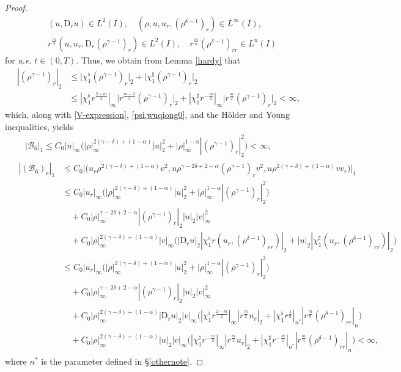 \documentclass[11pt,reqno]{amsart}
\numberwithin{rk}{section}
\numberwithin{prop}{section}
\numberwithin{mydef}{section}
\numberwithin{lem}{section}
\numberwithin{equation}{section}
\numberwithin{thm}{section}
\begin{document}
\begin{proof}
\begin{align*}
&(u,\mathrm{D}_r u)\in L^2(I),\quad  (\rho,u,u_r,(\rho^{\delta-1})_r)\in L^\infty(I),\\
&r^\frac{m}{2} (u,u_r,\mathrm{D}_r(\rho^{\gamma-1})_r)\in L^2(I),\quad r^\frac{m}{n} (\rho^{\delta-1})_{rr} \in L^n(I)
\end{align*}
for {\it a.e.} $t\in (0,T)$. Thus, we obtain from Lemma \ref{hardy} that
\begin{equation*}
\begin{aligned}
|(\rho^{\gamma-1})_r|_2&\leq  \big|\chi_1^\flat(\rho^{\gamma-1})_r\big|_2+\big|\chi_1^\sharp(\rho^{\gamma-1})_r\big|_2\\
&\leq |\chi_1^\flat r^\frac{2-m}{2}|_\infty\big|r^\frac{m-2}{2}(\rho^{\gamma-1})_r\big|_2 + |\chi_1^\sharp r^{-\frac{m}{2}}|_\infty \big|r^\frac{m}{2}(\rho^{\gamma-1})_r\big|_2<\infty,
\end{aligned}
\end{equation*}
which, along with \eqref{V-expression}, \eqref{psi,wuqiong0}, and the H\"older and Young inequalities, yields
\begin{align*}
&\quad\, |\mathcal{B}_6|_1 \leq C_0|u|_\infty\big(|\rho|_\infty^{2(\gamma-\delta)+(1-\alpha)}|u|_2^2+|\rho|_\infty^{1-\alpha}|(\rho^{\gamma-1})_r|_2^2\big)<\infty,\\[1mm]
&\begin{aligned}
|(\mathcal{B}_6)_r|_1&\leq C_0\big|\big(u_r\rho^{2(\gamma-\delta)+(1-\alpha)} v^2, u\rho^{\gamma-2\delta+2-\alpha}(\rho^{\gamma-1})_r v^2,u\rho^{2(\gamma-\delta)+(1-\alpha)} vv_r\big)\big|_1\\
&\leq C_0|u_r|_\infty\big(|\rho|_\infty^{2(\gamma-\delta)+(1-\alpha)}|u|_2^2+|\rho|_\infty^{1-\alpha}|(\rho^{\gamma-1})_r|_2^2\big)\\
&\quad +C_0|\rho|_\infty^{\gamma-2\delta+2-\alpha}|(\rho^{\gamma-1})_r|_2|u|_2|v|_\infty^2\\
&\quad+ C_0|\rho|_\infty^{2(\gamma-\delta)+(1-\alpha)}|v|_\infty\big( |\mathrm{D}_r u|_2|\chi_1^\flat r(u_r,(\rho^{\delta-1})_{rr})|_2+|u|_2|\chi_1^\sharp (u_r,(\rho^{\delta-1})_{rr})|_2\big)\\
&\leq C_0|u_r|_\infty\big(|\rho|_\infty^{2(\gamma-\delta)+(1-\alpha)}|u|_2^2+|\rho|_\infty^{1-\alpha}|(\rho^{\gamma-1})_r|_2^2\big)\\
&\quad +C_0|\rho|_\infty^{\gamma-2\delta+2-\alpha}|(\rho^{\gamma-1})_r|_2|u|_2|v|_\infty^2\\
&\quad+ C_0|\rho|_\infty^{2(\gamma-\delta)+(1-\alpha)} |\mathrm{D}_r u|_2|v|_\infty\big(|\chi_1^\flat r^\frac{2-m}{2}|_\infty |r^\frac{m}{2} u_r|_2+|\chi_1^\flat r^\frac{1}{n}|_{n^*}|r^\frac{m}{n} (\rho^{\delta-1})_{rr}|_n\big)\\
&\quad +C_0|\rho|_\infty^{2(\gamma-\delta)+(1-\alpha)}|u|_2|v|_\infty\big(|\chi_1^\sharp r^{-\frac{m}{2}}|_\infty |r^\frac{m}{2} u_r|_2+|\chi_1^\sharp r^{-\frac{m}{n}}|_{n^*} |r^\frac{m}{n} (\rho^{\delta-1})_{rr}|_n\big)<\infty,    
\end{aligned}
\end{align*}
where $n^*$ is the parameter defined in \S \ref{othernote}.




\end{proof}
\end{document}

